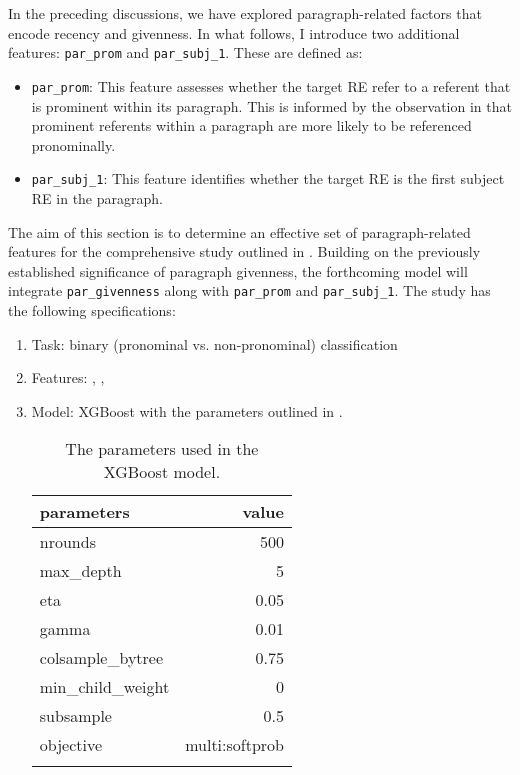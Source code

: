 In the preceding discussions, we have explored paragraph-related factors that encode recency and givenness. In what follows, I  introduce two additional features: \texttt{par\_prom} and \texttt{par\_subj\_1}. These are defined as:

\begin{itemize}
	\item \texttt{par\_prom}: This feature assesses whether the target RE refer to a referent that is prominent within its paragraph. This is informed by the observation in  that prominent referents within a paragraph are more likely to be referenced pronominally.
	\item \texttt{par\_subj\_1}: This feature identifies whether the target RE is the first subject RE in the paragraph.
\end{itemize}


The aim of this section is to determine an effective set of paragraph-related features for the comprehensive study outlined in . Building on the previously established significance of paragraph givenness, the forthcoming model will integrate \texttt{par\_givenness} along with \texttt{par\_prom} and \texttt{par\_subj\_1}. The study has the following specifications:

\begin{enumerate}
	\item Task: binary (pronominal vs. non-pronominal) classification
	\item Features: , , 
	\item Model: XGBoost with the parameters outlined in .
	\begin{table}
		\begin{tabular}{lr}
			\lsptoprule
			parameters & value\\
			\midrule
			nrounds & 500 \\
			max\_depth & 5 \\
			eta & 0.05 \\
			gamma & 0.01 \\
			colsample\_bytree & 0.75 \\
			min\_child\_weight & 0 \\
			subsample & 0.5 \\
			objective & multi:softprob \\ \lspbottomrule
		\end{tabular}\caption{The parameters used in the XGBoost model.}\label{tab:xgboostparam}
	\end{table}
\end{enumerate}



